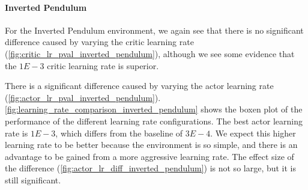 \documentclass{article}
\begin{document}
\paragraph{Inverted Pendulum}
For the Inverted Pendulum environment, we again see that there is no significant difference caused by varying the critic learning rate (\autoref{fig:critic_lr_pval_inverted_pendulum}), although we see some evidence that the \(1E-3\) critic learning rate is superior.

There is a significant difference caused by varying the actor learning rate (\autoref{fig:actor_lr_pval_inverted_pendulum}). \autoref{fig:learning_rate_comparison_inverted_pendulum} shows the boxen plot of the performance of the different learning rate configurations. The best actor learning rate is \(1E-3\), which differs from the baseline of \(3E-4\). We expect this higher learning rate to be better because the environment is so simple, and there is an advantage to be gained from a more aggressive learning rate. The effect size of the difference (\autoref{fig:actor_lr_diff_inverted_pendulum}) is not so large, but it is still significant.
\end{document}
